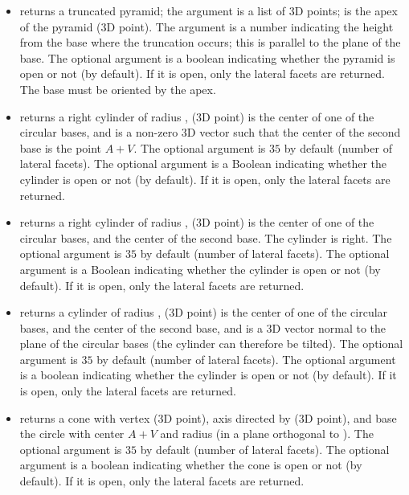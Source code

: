 \begin{itemize}
    \item {} returns a truncated pyramid; the argument  is a list of 3D points;  is the apex of the pyramid (3D point). The argument  is a number indicating the height from the base where the truncation occurs; this is parallel to the plane of the base. The optional argument  is a boolean indicating whether the pyramid is open or not (\false by default). If it is open, only the lateral facets are returned. The base must be oriented by the apex.

    \item {} returns a right cylinder of radius ,  (3D point) is the center of one of the circular bases, and  is a non-zero 3D vector such that the center of the second base is the point $A+V$. The optional argument  is $35$ by default (number of lateral facets). The optional argument  is a Boolean indicating whether the cylinder is open or not (\false by default). If it is open, only the lateral facets are returned.

    \item {} returns a right cylinder of radius ,  (3D point) is the center of one of the circular bases, and  the center of the second base. The cylinder is right. The optional argument  is $35$ by default (number of lateral facets). The optional argument  is a Boolean indicating whether the cylinder is open or not (\false by default). If it is open, only the lateral facets are returned.

    \item {} returns a cylinder of radius ,  (3D point) is the center of one of the circular bases, and  the center of the second base, and  is a 3D vector normal to the plane of the circular bases (the cylinder can therefore be tilted). The optional argument  is $35$ by default (number of lateral facets). The optional argument  is a boolean indicating whether the cylinder is open or not (\false by default). If it is open, only the lateral facets are returned.
    
    \item {} returns a cone with vertex  (3D point), axis  directed by  (3D point), and base the circle with center $A+V$ and radius  (in a plane orthogonal to ). The optional argument  is $35$ by default (number of lateral facets). The optional argument  is a boolean indicating whether the cone is open or not (\false by default). If it is open, only the lateral facets are returned.


\end{itemize}
